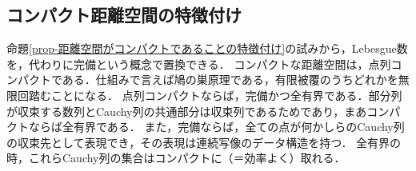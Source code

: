 \documentclass[uplatex,dvipdfmx]{jsreport}
\begin{document}
\subsection{コンパクト距離空間の特徴付け}

\begin{tcolorbox}[colframe=ForestGreen, colback=ForestGreen!10!white, breakable ,colbacktitle=ForestGreen!40!white, coltitle=black,fonttitle=\bfseries\sffamily
    ,title=完備性によるコンパクト距離空間の特徴付け]
    命題\ref{prop-距離空間がコンパクトであることの特徴付け}の試みから，Lebesgue数を，代わりに完備という概念で置換できる．
    コンパクトな距離空間は，点列コンパクトである．仕組みで言えば鳩の巣原理である，有限被覆のうちどれかを無限回踏むことになる．
    点列コンパクトならば，完備かつ全有界である．部分列が収束する数列とCauchy列の共通部分は収束列であるためであり，まあコンパクトならば全有界である．
    また，完備ならば，全ての点が何かしらのCauchy列の収束先として表現でき，その表現は連続写像のデータ構造を持つ．
    全有界の時，これらCauchy列の集合はコンパクトに（＝効率よく）取れる．
\end{tcolorbox}
\end{document}
